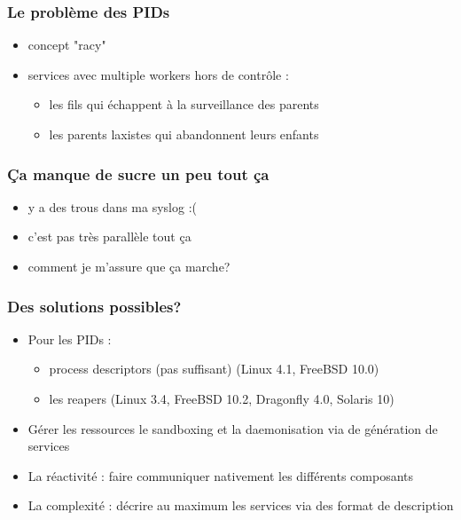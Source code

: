 \begin{frame}
	\frametitle{Le problème des PIDs}
	\begin{itemize}
			\pause
		\item concept "racy"
			\pause
		\item services avec multiple workers hors de contrôle :
			\begin{itemize}
				\item les fils qui échappent à la surveillance des parents
				\item les parents laxistes qui abandonnent leurs enfants
			\end{itemize}
	\end{itemize}
\end{frame}

\begin{frame}
	\frametitle{Ça manque de sucre un peu tout ça}
	\begin{itemize}
		\item y a des trous dans ma syslog :(
		\item c'est pas très parallèle tout ça
		\item comment je m'assure que ça marche?
	\end{itemize}
\end{frame}

\begin{frame}
	\frametitle{Des solutions possibles?}
	\begin{itemize}
		\item Pour les PIDs :
			\begin{itemize}
					\pause
				\item process descriptors (pas suffisant) (Linux 4.1, FreeBSD 10.0)
					\pause
				\item les reapers (Linux 3.4, FreeBSD 10.2, Dragonfly 4.0, Solaris 10)
			\end{itemize}
			\pause
		\item Gérer les ressources le sandboxing et la daemonisation via de génération de services
			\pause
		\item La réactivité : faire communiquer nativement les différents composants
			\pause
		\item La complexité : décrire au maximum les services via des format de description
	\end{itemize}
\end{frame}

